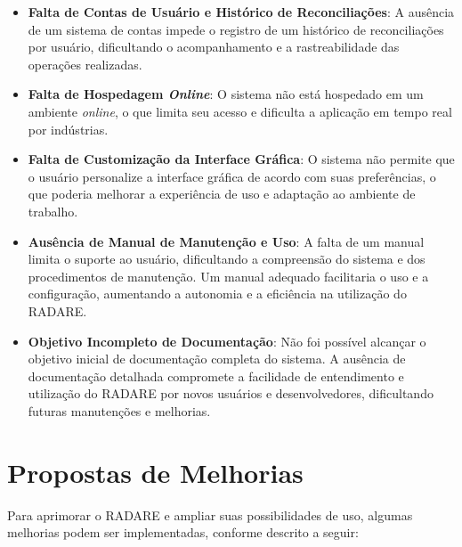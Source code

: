 \begin{itemize}
    \item \textbf{Falta de Contas de Usuário e Histórico de Reconciliações}: A ausência de um sistema de contas impede o registro de um histórico de reconciliações por usuário, dificultando o acompanhamento e a rastreabilidade das operações realizadas.

    \item \textbf{Falta de Hospedagem \textit{Online}}: O sistema não está hospedado em um ambiente \textit{online}, o que limita seu acesso e dificulta a aplicação em tempo real por indústrias.

    \item \textbf{Falta de Customização da Interface Gráfica}: O sistema não permite que o usuário personalize a interface gráfica de acordo com suas preferências, o que poderia melhorar a experiência de uso e adaptação ao ambiente de trabalho.

    \item \textbf{Ausência de Manual de Manutenção e Uso}: A falta de um manual limita o suporte ao usuário, dificultando a compreensão do sistema e dos procedimentos de manutenção. Um manual adequado facilitaria o uso e a configuração, aumentando a autonomia e a eficiência na utilização do RADARE.

    \item \textbf{Objetivo Incompleto de Documentação}: Não foi possível alcançar o objetivo inicial de documentação completa do sistema. A ausência de documentação detalhada compromete a facilidade de entendimento e utilização do RADARE por novos usuários e desenvolvedores, dificultando futuras manutenções e melhorias.
\end{itemize}

\section{Propostas de Melhorias}

Para aprimorar o RADARE e ampliar suas possibilidades de uso, algumas melhorias podem ser implementadas, conforme descrito a seguir:

